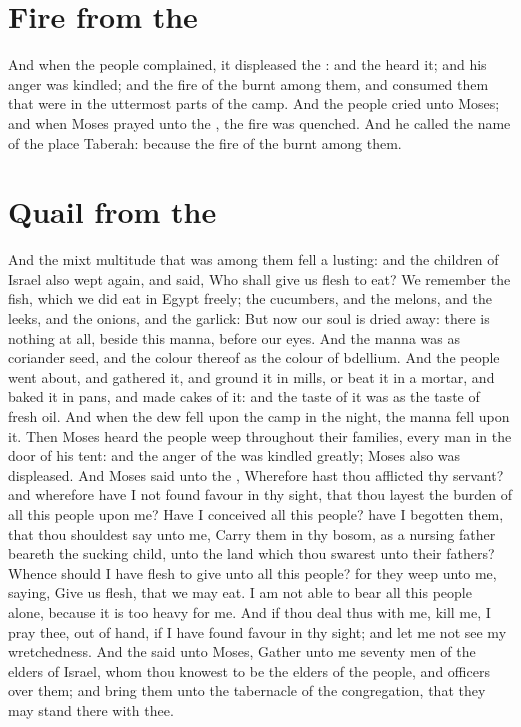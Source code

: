 \section*{Fire from the \LORD}
\begin{biblechapter} %
\verse And when the people complained, it displeased the \LORD: and the \LORD heard it; and his anger was kindled; and the fire of the \LORD burnt among them, and consumed them that were in the uttermost parts of the camp.
\verse And the people cried unto Moses; and when Moses prayed unto the \LORD, the fire was quenched.
\verse And he called the name of the place Taberah: because the fire of the \LORD burnt among them.
\section*{Quail from the \LORD}
\verse And the mixt multitude that was among them fell a lusting: and the children of Israel also wept again, and said, Who shall give us flesh to eat?
\verse We remember the fish, which we did eat in Egypt freely; the cucumbers, and the melons, and the leeks, and the onions, and the garlick:
\verse But now our soul is dried away: there is nothing at all, beside this manna, before our eyes.
\verse And the manna was as coriander seed, and the colour thereof as the colour of bdellium.
\verse And the people went about, and gathered it, and ground it in mills, or beat it in a mortar, and baked it in pans, and made cakes of it: and the taste of it was as the taste of fresh oil.
\verse And when the dew fell upon the camp in the night, the manna fell upon it.
\verse Then Moses heard the people weep throughout their families, every man in the door of his tent: and the anger of the \LORD was kindled greatly; Moses also was displeased.
\verse And Moses said unto the \LORD, Wherefore hast thou afflicted thy servant? and wherefore have I not found favour in thy sight, that thou layest the burden of all this people upon me?
\verse Have I conceived all this people? have I begotten them, that thou shouldest say unto me, Carry them in thy bosom, as a nursing father beareth the sucking child, unto the land which thou swarest unto their fathers?
\verse Whence should I have flesh to give unto all this people? for they weep unto me, saying, Give us flesh, that we may eat.
\verse I am not able to bear all this people alone, because it is too heavy for me.
\verse And if thou deal thus with me, kill me, I pray thee, out of hand, if I have found favour in thy sight; and let me not see my wretchedness.
\verse And the \LORD said unto Moses, Gather unto me seventy men of the elders of Israel, whom thou knowest to be the elders of the people, and officers over them; and bring them unto the tabernacle of the congregation, that they may stand there with thee.

\end{biblechapter}
